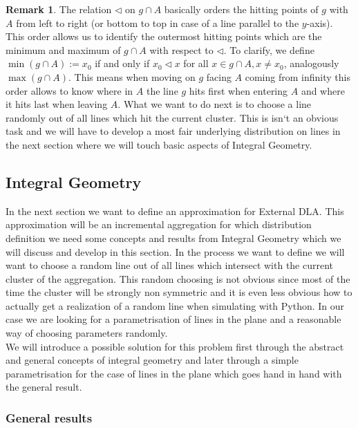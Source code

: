 \documentclass[12pt,a4paper]{scrartcl}
\numberwithin{equation}{subsection}
\newcommand{\1}{\mathbbm{1}}
\numberwithin{equation}{section}
\theoremstyle{definition}
\newtheorem{remark}{Remark}[subsection]
\begin{document}
\begin{remark}
	The relation $\triangleleft$ on $g\cap A$ basically orders the hitting points of $g$ with $A$ from left to right (or bottom to top in case of a line parallel to the $y$-axis). This order allows us to identify the outermost hitting points which are the minimum and maximum of $g\cap A$ with respect to $\triangleleft$. To clarify, we define $\min (g\cap A) := x_0$ if and only if $x_0 \triangleleft x$ for all $x\in g\cap A,x\neq x_0$, analogously $\max(g\cap A)$. This means when moving on $g$ facing $A$ coming from infinity this order allows to know where in $A$ the line $g$ hits first when \glqq entering \grqq $A$ and where it hits last when \glqq leaving \grqq $A$. What we want to do next is to choose a line randomly out of all lines which hit the current cluster. This is isn`t an obvious task and we will have to develop a most fair underlying distribution on lines in the next section where we will touch basic aspects of Integral Geometry. 
\end{remark}






\subsection{Integral Geometry}

In the next section we want to define an approximation for External DLA. This approximation will be an incremental aggregation for which distribution definition we need some concepts and results from Integral Geometry which we will discuss and develop in this section. In the process we want to define we will want to choose a random line out of all lines which intersect with the current cluster of the aggregation. This random choosing is not obvious since most of the time the cluster will be strongly non symmetric and it is even less obvious how to actually get a realization of a random line when simulating with Python. In our case we are looking for a parametrisation of lines in the plane and a reasonable way of choosing parameters randomly. \\

We will introduce a possible solution for this problem first through the abstract and general concepts of integral geometry and later through a simple parametrisation for the case of lines in the plane which goes hand in hand with the general result.

\subsubsection{General results}
\end{document}
